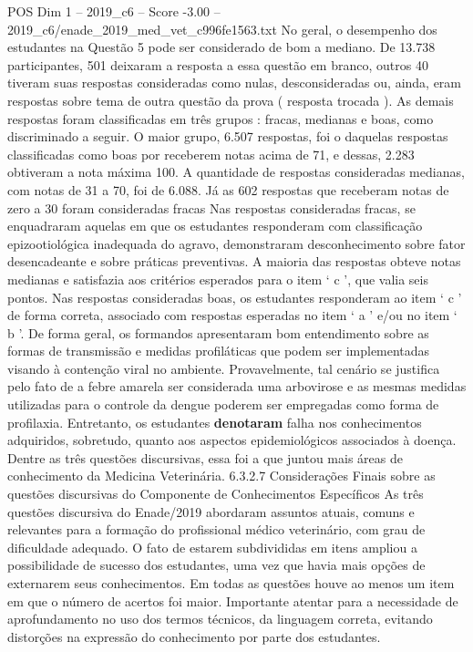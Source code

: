 \begin{textsample}{POS Dim 1 – 2019\_c6 – Score -3.00 – 2019\_c6/enade\_2019\_med\_vet\_c996fe1563.txt}
No geral, o desempenho dos estudantes na Questão 5 pode ser considerado de bom a mediano.
De 13.738 participantes, 501 deixaram a resposta a essa questão em branco, outros 40 tiveram suas respostas consideradas como nulas, desconsideradas ou, ainda, eram respostas sobre tema de outra questão da prova ( resposta trocada ).
As demais respostas foram classificadas em três grupos : fracas, medianas e boas, como discriminado a seguir.
O maior grupo, 6.507 respostas, foi o daquelas respostas classificadas como boas por receberem notas acima de 71, e dessas, 2.283 obtiveram a nota máxima 100.
A quantidade de respostas consideradas medianas, com notas de 31 a 70, foi de 6.088.
Já as 602 respostas que receberam notas de zero a 30 foram consideradas fracas Nas respostas consideradas fracas, se enquadraram aquelas em que os estudantes responderam com classificação epizootiológica inadequada do agravo, demonstraram desconhecimento sobre fator desencadeante e sobre práticas preventivas.
A maioria das respostas obteve notas medianas e satisfazia aos critérios esperados para o item ‘ c ’, que valia seis pontos.
Nas respostas consideradas boas, os estudantes responderam ao item ‘ c ’ de forma correta, associado com respostas esperadas no item ‘ a ’ e/ou no item ‘ b ’.
De forma geral, os formandos apresentaram bom entendimento sobre as formas de transmissão e medidas profiláticas que podem ser implementadas visando à contenção viral no ambiente.
Provavelmente, tal cenário se justifica pelo fato de a febre amarela ser considerada uma arbovirose e as mesmas medidas utilizadas para o controle da dengue poderem ser empregadas como forma de profilaxia.
Entretanto, os estudantes \textbf{denotaram} falha nos conhecimentos adquiridos, sobretudo, quanto aos aspectos epidemiológicos associados à doença.
Dentre as três questões discursivas, essa foi a que juntou mais áreas de conhecimento da Medicina Veterinária. 6.3.2.7 Considerações Finais sobre as questões discursivas do Componente de Conhecimentos Específicos As três questões discursiva do Enade/2019 abordaram assuntos atuais, comuns e relevantes para a formação do profissional médico veterinário, com grau de dificuldade adequado.
O fato de estarem subdivididas em itens ampliou a possibilidade de sucesso dos estudantes, uma vez que havia mais opções de externarem seus conhecimentos.
Em todas as questões houve ao menos um item em que o número de acertos foi maior.
Importante atentar para a necessidade de aprofundamento no uso dos termos técnicos, da linguagem correta, evitando distorções na expressão do conhecimento por parte dos estudantes.

\end{textsample}
